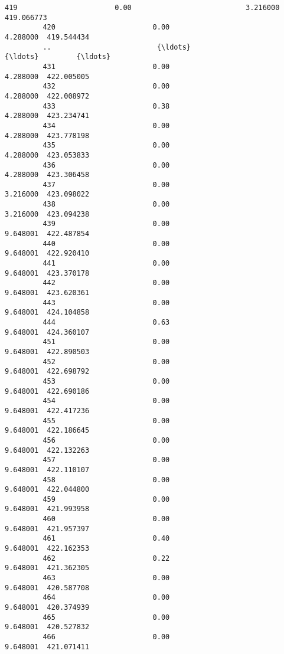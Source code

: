 \documentclass[11pt]{article}
\begin{document}
\begin{Verbatim}[commandchars=\\\{\}]
         419                       0.00                           3.216000  419.066773   
         420                       0.00                           4.288000  419.544434   
         ..                         {\ldots}                                {\ldots}         {\ldots}   
         431                       0.00                           4.288000  422.005005   
         432                       0.00                           4.288000  422.008972   
         433                       0.38                           4.288000  423.234741   
         434                       0.00                           4.288000  423.778198   
         435                       0.00                           4.288000  423.053833   
         436                       0.00                           4.288000  423.306458   
         437                       0.00                           3.216000  423.098022   
         438                       0.00                           3.216000  423.094238   
         439                       0.00                           9.648001  422.487854   
         440                       0.00                           9.648001  422.920410   
         441                       0.00                           9.648001  423.370178   
         442                       0.00                           9.648001  423.620361   
         443                       0.00                           9.648001  424.104858   
         444                       0.63                           9.648001  424.360107   
         451                       0.00                           9.648001  422.890503   
         452                       0.00                           9.648001  422.698792   
         453                       0.00                           9.648001  422.690186   
         454                       0.00                           9.648001  422.417236   
         455                       0.00                           9.648001  422.186645   
         456                       0.00                           9.648001  422.132263   
         457                       0.00                           9.648001  422.110107   
         458                       0.00                           9.648001  422.044800   
         459                       0.00                           9.648001  421.993958   
         460                       0.00                           9.648001  421.957397   
         461                       0.40                           9.648001  422.162353   
         462                       0.22                           9.648001  421.362305   
         463                       0.00                           9.648001  420.587708   
         464                       0.00                           9.648001  420.374939   
         465                       0.00                           9.648001  420.527832   
         466                       0.00                           9.648001  421.071411   
         

\end{Verbatim}
\end{document}
